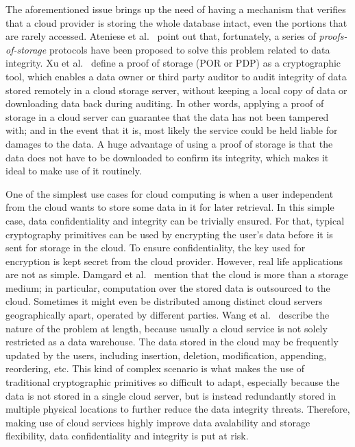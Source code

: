 The aforementioned issue brings up the need of having a mechanism that verifies that a cloud provider is storing the whole database intact, even the portions that are rarely accessed. Ateniese et al.\ \cite{cryptoeprint:2014:886} point out that, fortunately, a series of \emph{proofs-of-storage} protocols have been proposed to solve this problem related to data integrity. Xu et al.\ \cite{cryptoeprint:2014:395} define a proof of storage (POR or PDP) as a cryptographic tool, which enables a data owner or third party auditor to audit integrity of data stored remotely in a cloud storage server, without keeping a local copy of data or downloading data back during auditing. In other words, applying a proof of storage in a cloud server can guarantee that the data has not been tampered with; and in the event that it is, most likely the service could be held liable for damages to the data. A huge advantage of using a proof of storage is that the data does not have to be downloaded to confirm its integrity, which makes it ideal to make use of it routinely. 

One of the simplest use cases for cloud computing is when a user independent from the cloud wants to store some data in it for later retrieval. In this simple case, data confidentiality and integrity can be trivially ensured. For that, typical cryptography primitives can be used by encrypting the user's data before it is sent for storage in the cloud. To ensure confidentiality, the key used for encryption is kept secret from the cloud provider. However, real life applications are not as simple. Damgard et al.\ \cite{cryptoeprint:2013:629} mention that the cloud is more than a storage medium; in particular, computation over the stored data is outsourced to the cloud. Sometimes it might even be distributed among distinct cloud servers geographically apart, operated by different parties. Wang et al.\ \cite{cryptoeprint:2009:081} describe the nature of the problem at length, because usually a cloud service is not solely restricted as a data warehouse. The data stored in the cloud may be frequently updated by the users, including insertion, deletion, modification, appending, reordering, etc. This kind of complex scenario is what makes the use of traditional cryptographic primitives so difficult to adapt, especially because the data is not stored in a single cloud server, but is instead redundantly stored in multiple physical locations to further reduce the data integrity threats. Therefore, making use of cloud services highly improve data avalability and storage flexibility, data confidentiality and integrity is put at risk.


